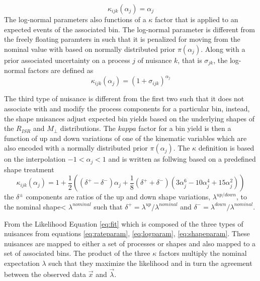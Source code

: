 \begin{equation}
\label{eq:rateparam}
\kappa_{ijk}(\alpha_j) = \alpha_j
\end{equation}  
The log-normal parameters also functions of a $\kappa$ factor that is applied to an expected events of the associated bin. The log-normal parameter is different from the freely floating paramters in such that it is penalized for moving from the nominal value with based on normally distributed prior $\pi(\alpha_j)$. Along with a prior associated uncertainty on a process $j$ of nuisance $k$, that is $\sigma_{jk}$, the log-normal factors are defined as
\begin{equation}
\label{eq:logparam}
\kappa_{ijk}(\alpha_j) = (1+\sigma_{ijk})^{\alpha_j}
\end{equation}

The third type of nuisance is different from the first two such that it does not associate with and modify the process components for a particular bin, instead, the shape nuisances adjust expected bin yields based on the underlying shapes of the $R_{ISR}$ and $M_\perp$ distributions. The $kappa$ factor for a bin yield is then a function of up and down variations of one of the kinematic variables which are also encoded with a normally distributed prior $\pi(\alpha_j)$. The $\kappa$ definition is based on the interpolation $-1<\alpha_j<1$ and is written as follwing based on a predefined shape treatment \cite{Conway:2011in}
\begin{equation}
\label{eq:shapeparam}
\kappa_{ijk}(\alpha_j)= 1 + \frac{1}{2}((\delta^+ - \delta^-)\alpha_j + \frac{1}{8}(\delta^+ + \delta^-)(3\alpha_j^6-10\alpha_j^4+15\alpha_j^2))
\end{equation}
the $\delta^\pm$ components are ratios of the up and down shape variations, $\lambda^{up/down}$, to the nominal shape< $\lambda^{nominal}$ such that $\delta^+ = \lambda^{up}/\lambda^{nominal}$ and $\delta^- = \lambda^{down}/\lambda^{nominal}.$

From the Likelihood Equation \ref{eq:fit} which is composed of the three types of nuisances from equations \ref{eq:rateparam}, \ref{eq:logparam}, \ref{eq:shapeparam}. These nuisances are mapped to either a set of processes or shapes and also mapped to a set of associated bins. The product of the three $\kappa$ factors multiply the nominal expectation $\lambda$ such that they maximize the likelihood and in turn the agreement between the observed data $\vec{x}$ and $\vec{\lambda}$. 



